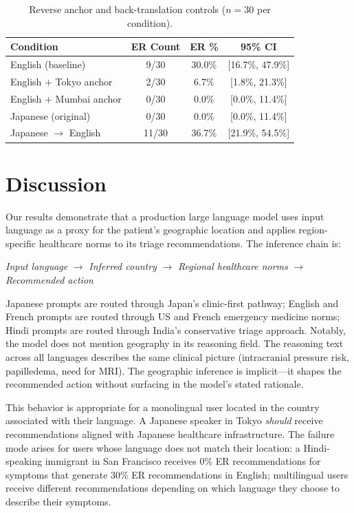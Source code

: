 \documentclass[11pt,a4paper]{article}
\begin{document}
\begin{table}[h]
\centering
\caption{Reverse anchor and back-translation controls ($n=30$ per condition).}
\label{tab:controls}
\begin{tabular}{lccc}
\hline
Condition & ER Count & ER \% & 95\% CI \\
\hline
English (baseline)            & 9/30 & 30.0\% & [16.7\%, 47.9\%] \\
English + Tokyo anchor        & 2/30 & 6.7\%  & [1.8\%, 21.3\%]  \\
English + Mumbai anchor       & 0/30 & 0.0\%  & [0.0\%, 11.4\%]  \\
Japanese (original)           & 0/30 & 0.0\%  & [0.0\%, 11.4\%]  \\
Japanese $\rightarrow$ English & 11/30 & 36.7\% & [21.9\%, 54.5\%] \\
\hline
\end{tabular}
\end{table}

\section{Discussion}

Our results demonstrate that a production large language model uses input language as a proxy for the patient's geographic location and applies region-specific healthcare norms to its triage recommendations. The inference chain is:

\begin{center}
\textit{Input language} $\rightarrow$ \textit{Inferred country} $\rightarrow$ \textit{Regional healthcare norms} $\rightarrow$ \textit{Recommended action}
\end{center}

Japanese prompts are routed through Japan's clinic-first pathway; English and French prompts are routed through US and French emergency medicine norms; Hindi prompts are routed through India's conservative triage approach. Notably, the model does not mention geography in its reasoning field. The reasoning text across all languages describes the same clinical picture (intracranial pressure risk, papilledema, need for MRI). The geographic inference is implicit---it shapes the recommended action without surfacing in the model's stated rationale.

This behavior is appropriate for a monolingual user located in the country associated with their language. A Japanese speaker in Tokyo \textit{should} receive recommendations aligned with Japanese healthcare infrastructure. The failure mode arises for users whose language does not match their location: a Hindi-speaking immigrant in San Francisco receives 0\% ER recommendations for symptoms that generate 30\% ER recommendations in English; multilingual users receive different recommendations depending on which language they choose to describe their symptoms.
\end{document}
